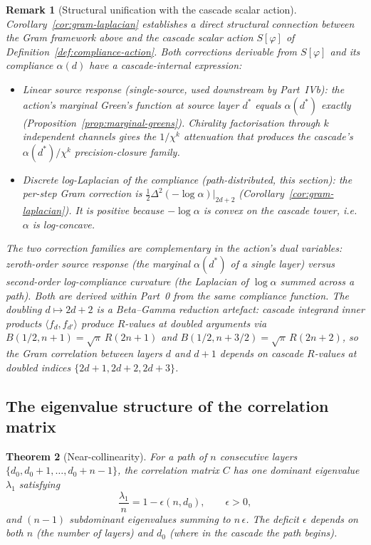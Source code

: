 \documentclass[11pt,a4paper]{article}
\newtheorem{theorem}{Theorem}[section]
\newtheorem{remark}[theorem]{Remark}
\begin{document}
\begin{remark}[Structural unification with the cascade scalar action]\label{rem:gram-action-unification}
Corollary~\ref{cor:gram-laplacian} establishes a direct structural connection between the Gram framework above and the cascade scalar action $S[\varphi]$ of Definition~\ref{def:compliance-action}. Both corrections derivable from $S[\varphi]$ and its compliance $\alpha(d)$ have a cascade-internal expression:
\begin{itemize}
\item \emph{Linear source response} (single-source, used downstream by Part~IVb): the action's marginal Green's function at source layer $d^*$ equals $\alpha(d^*)$ exactly (Proposition~\ref{prop:marginal-greens}). Chirality factorisation through $k$ independent channels gives the $1/\chi^k$ attenuation that produces the cascade's $\alpha(d^*)/\chi^k$ precision-closure family.
\item \emph{Discrete log-Laplacian of the compliance} (path-distributed, this section): the per-step Gram correction is $\frac{1}{2}\Delta^2(-\log\alpha)|_{2d+2}$ (Corollary~\ref{cor:gram-laplacian}). It is positive because $-\log\alpha$ is convex on the cascade tower, i.e.\ $\alpha$ is log-concave.
\end{itemize}
The two correction families are complementary in the action's dual variables: zeroth-order source response (the marginal $\alpha(d^*)$ of a single layer) versus second-order log-compliance curvature (the Laplacian of $\log\alpha$ summed across a path). Both are derived within Part~0 from the same compliance function. The doubling $d\mapsto 2d+2$ is a Beta--Gamma reduction artefact: cascade integrand inner products $\langle f_d, f_{d'}\rangle$ produce $R$-values at doubled arguments via $B(1/2, n+1) = \sqrt{\pi}\,R(2n+1)$ and $B(1/2, n+3/2) = \sqrt{\pi}\,R(2n+2)$, so the Gram correlation between layers $d$ and $d+1$ depends on cascade $R$-values at doubled indices $\{2d+1, 2d+2, 2d+3\}$.
\end{remark}

\subsection{The eigenvalue structure of the correlation matrix}

\begin{theorem}[Near-collinearity]\label{thm:eigenvalue}
For a path of $n$ consecutive layers $\{d_0, d_0+1, \ldots, d_0+n-1\}$, the correlation matrix $C$ has one dominant eigenvalue $\lambda_1$ satisfying
\[
\frac{\lambda_1}{n} = 1 - \epsilon(n, d_0), \qquad \epsilon > 0,
\]
and $(n - 1)$ subdominant eigenvalues summing to $n\,\epsilon$. The deficit $\epsilon$ depends on both $n$ (the number of layers) and $d_0$ (where in the cascade the path begins).
\end{theorem}
\end{document}
